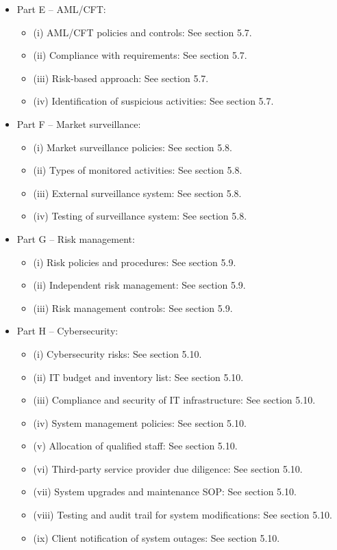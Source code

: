 \documentclass[]{report}
\begin{document}
\begin{itemize}
\item Part E – AML/CFT:
  \begin{itemize}
\item (i) AML/CFT policies and controls: See section 5.7.
\item (ii) Compliance with requirements: See section 5.7.
\item (iii) Risk-based approach: See section 5.7.
\item (iv) Identification of suspicious activities: See section 5.7.
\end{itemize}
\item Part F – Market surveillance:
  \begin{itemize}
\item (i) Market surveillance policies: See section 5.8.
\item (ii) Types of monitored activities: See section 5.8.
\item (iii) External surveillance system: See section 5.8.
\item (iv) Testing of surveillance system: See section 5.8.
\end{itemize}
\item Part G – Risk management:
    \begin{itemize}
\item (i) Risk policies and procedures: See section 5.9.
\item (ii) Independent risk management: See section 5.9.
\item (iii) Risk management controls: See section 5.9.
\end{itemize}
\item Part H – Cybersecurity:
  \begin{itemize}
\item (i) Cybersecurity risks: See section 5.10.
\item (ii) IT budget and inventory list: See section 5.10.
\item (iii) Compliance and security of IT infrastructure: See section 5.10.
\item (iv) System management policies: See section 5.10.
\item (v) Allocation of qualified staff: See section 5.10.
\item (vi) Third-party service provider due diligence: See section 5.10.
\item (vii) System upgrades and maintenance SOP: See section 5.10.
\item (viii) Testing and audit trail for system modifications: See section 5.10.
\item (ix) Client notification of system outages: See section 5.10.

\end{itemize}
\end{itemize}
\end{document}
